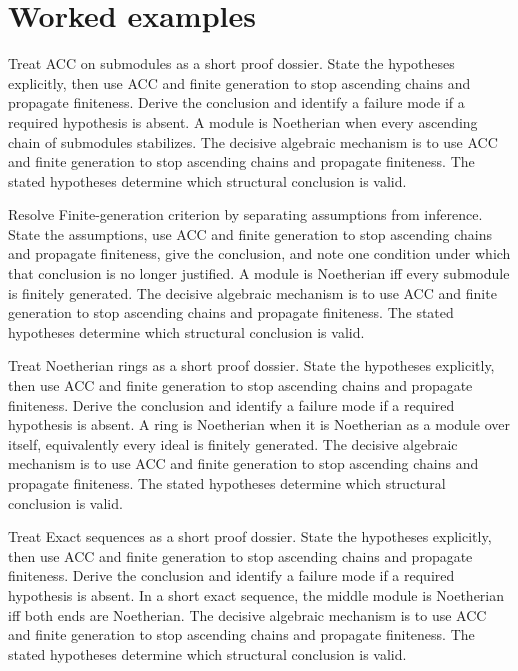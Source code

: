 \section{Worked examples}

\begin{example}\label{ex:v15-worked-01}
Treat ACC on submodules as a short proof dossier. State the hypotheses explicitly, then use ACC and finite generation to stop ascending chains and propagate finiteness. Derive the conclusion and identify a failure mode if a required hypothesis is absent. A module is Noetherian when every ascending chain of submodules stabilizes. The decisive algebraic mechanism is to use ACC and finite generation to stop ascending chains and propagate finiteness. The stated hypotheses determine which structural conclusion is valid.
\end{example}

\begin{example}\label{ex:v15-worked-02}
Resolve Finite-generation criterion by separating assumptions from inference. State the assumptions, use ACC and finite generation to stop ascending chains and propagate finiteness, give the conclusion, and note one condition under which that conclusion is no longer justified. A module is Noetherian iff every submodule is finitely generated. The decisive algebraic mechanism is to use ACC and finite generation to stop ascending chains and propagate finiteness. The stated hypotheses determine which structural conclusion is valid.
\end{example}

\begin{example}\label{ex:v15-worked-03}
Treat Noetherian rings as a short proof dossier. State the hypotheses explicitly, then use ACC and finite generation to stop ascending chains and propagate finiteness. Derive the conclusion and identify a failure mode if a required hypothesis is absent. A ring is Noetherian when it is Noetherian as a module over itself, equivalently every ideal is finitely generated. The decisive algebraic mechanism is to use ACC and finite generation to stop ascending chains and propagate finiteness. The stated hypotheses determine which structural conclusion is valid.
\end{example}

\begin{example}\label{ex:v15-worked-04}
Treat Exact sequences as a short proof dossier. State the hypotheses explicitly, then use ACC and finite generation to stop ascending chains and propagate finiteness. Derive the conclusion and identify a failure mode if a required hypothesis is absent. In a short exact sequence, the middle module is Noetherian iff both ends are Noetherian. The decisive algebraic mechanism is to use ACC and finite generation to stop ascending chains and propagate finiteness. The stated hypotheses determine which structural conclusion is valid.
\end{example}

